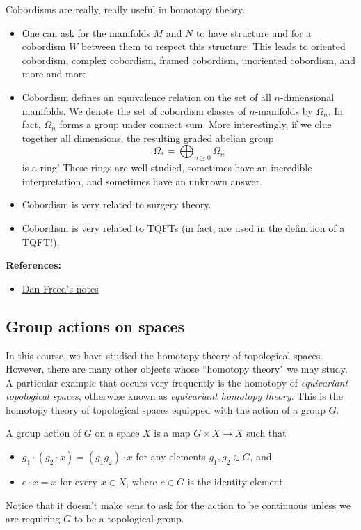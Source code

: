 \documentclass[10pt]{amsart}
\theoremstyle{definition}
\newcommand{\cdef}[1]{\textcolor{Bittersweet}{#1}}
\begin{document}
Cobordisms are really, really useful in homotopy theory.
\begin{itemize}
    \item One can ask for the manifolds $M$ and $N$ to have structure and for a cobordism $W$ between them to respect this structure. This leads to oriented cobordism, complex cobordism, framed cobordism, unoriented cobordism, and more and more.
    \item Cobordism defines an equivalence relation on the set of all $n$-dimensional manifolds. We denote the set of cobordism classes of $n$-manifolds by $\Omega_n$. In fact, $\Omega_n$ forms a group under connect sum. More interestingly, if we clue together all dimensions, the resulting graded abelian group
    \[\Omega_* = \bigoplus_{n \geq 0} \Omega_n\]
    is a ring! These rings are well studied, sometimes have an incredible interpretation, and sometimes have an unknown answer.
    \item Cobordism is very related to surgery theory.
    \item Cobordism is very related to TQFTs (in fact, are used in the definition of a TQFT!).
\end{itemize}

\textbf{References:}
\begin{itemize}
    \item \href{https://web.ma.utexas.edu/users/dafr/bordism.pdf}{Dan Freed's notes}
\end{itemize}


\subsection*{Group actions on spaces}
In this course, we have studied the homotopy theory of topological spaces. However, there are many other objects whose ``homotopy theory" we may study. A particular example that occurs very frequently is the homotopy of \emph{\cdef{equivariant topological spaces}}, otherwise known as \emph{\cdef{equivariant homotopy theory}}. This is the homotopy theory of topological spaces equipped with the action of a group $G$. 

A group action of $G$ on a space $X$ is a map $G \times X \to X$ such that
\begin{itemize}
    \item $g_1 \cdot (g_2 \cdot x) = (g_1 g_2) \cdot x$ for any elements $g_1, g_2 \in G$, and
    \item $e \cdot x=x$ for every $x \in X$, where $e\in G$ is the identity element.
\end{itemize}
Notice that it doesn't make sens to ask for the action to be continuous unless we are requiring $G$ to be a topological group. 
\end{document}
